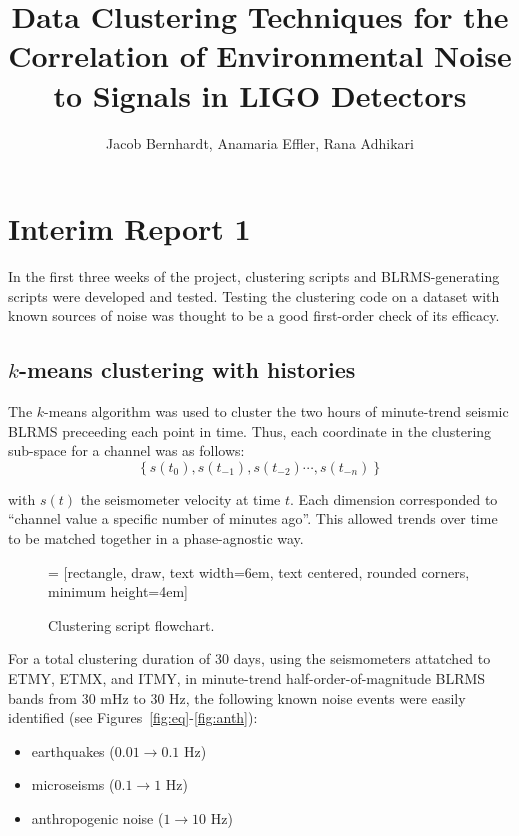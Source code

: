 \documentclass[colorlinks=true,pdfstartview=FitV,linkcolor=blue,
            citecolor=red,urlcolor=magenta]{ligodoc}
\title{Data Clustering Techniques for the Correlation of Environmental Noise to Signals in LIGO Detectors}
\author{Jacob Bernhardt, Anamaria Effler, Rana Adhikari}
\begin{document}


\section{Interim Report 1}

In the first three weeks of the project, clustering scripts and BLRMS-generating scripts were developed and tested. Testing the clustering code on a dataset with known sources of noise was thought to be a good first-order check of its efficacy.

\subsection{$k$-means clustering with histories}
The $k$-means algorithm was used to cluster the two hours of minute-trend seismic BLRMS preceeding each point in time. Thus, each coordinate in the clustering sub-space for a channel was as follows:
\begin{equation}
  \left\{s(t_0),s(t_{-1}),s(t_{-2})\cdots,s(t_{-n})\right\}
\end{equation}

with $s(t)$ the seismometer velocity at time $t$. Each dimension corresponded to ``channel value a specific number of minutes ago''. This allowed trends over time to be matched together in a phase-agnostic way.

\begin{figure}[h]
   = [rectangle, draw, text width=6em, text centered, rounded corners, minimum height=4em]
  \caption{Clustering script flowchart.}
\end{figure}

For a total clustering duration of 30 days, using the seismometers attatched to ETMY, ETMX, and ITMY, in minute-trend half-order-of-magnitude BLRMS bands from 30 mHz to 30 Hz, the following known noise events were easily identified (see Figures~\ref{fig:eq}-\ref{fig:anth}):
\begin{itemize}
\item earthquakes ($0.01\to0.1$ Hz)
\item microseisms ($0.1\to1$ Hz)
\item anthropogenic noise ($1\to10$ Hz)
\end{itemize}
\end{document}
